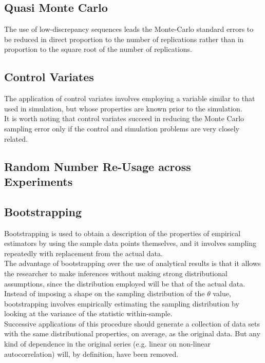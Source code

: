 \subsection{Quasi Monte Carlo}
The use of low-discrepancy sequences leads the Monte-Carlo standard errors to be reduced in direct proportion to the number of replications rather than in proportion to the square root of the number of replications.

\subsection{Control Variates}
The application of control variates involves employing a variable similar to that used in simulation, but whose properties are known prior to the simulation.\\
It is worth noting that control variates succeed in reducing the Monte Carlo sampling error only if the control and simulation problems are very closely related.

\subsection{Random Number Re-Usage across Experiments}

\subsection{Bootstrapping}
Bootstrapping is used to obtain a description of the properties of empirical estimators by using the sample data points themselves, and it involves sampling repeatedly with replacement from the actual data.\\
The advantage of bootstrapping over the use of analytical results is that it allows the researcher to make inferences without making strong distributional assumptions, since the distribution employed will be that of the actual data.\\
Instead of imposing a shape on the sampling distribution of the $\theta$ value, bootstrapping involves empirically estimating the sampling distribution by looking at the variance of the statistic within-sample.\\
Successive applications of this procedure should generate a collection of data sets with the same distributional properties, on average, as the original data. But any kind of dependence in the original series (e.g. linear on non-linear autocorrelation) will, by definition, have been removed.

